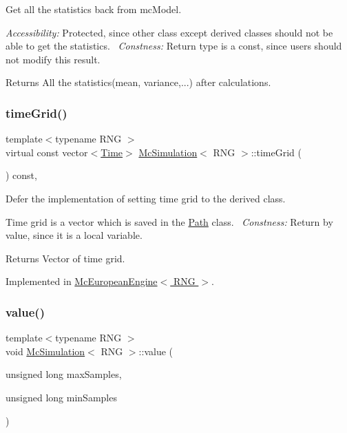 Get all the statistics back from mc\+Model. 

{\itshape Accessibility\+:} Protected, since other class except derived classes should not be able to get the statistics.~\newline
{\itshape Constness\+:} Return type is a const, since users should not modify this result. \begin{DoxyReturn}{Returns}
All the statistics(mean, variance,...) after calculations. 
\end{DoxyReturn}
\hypertarget{class_mc_simulation_a8af54a9121f2d875872295b03a1b2a40}{}\label{class_mc_simulation_a8af54a9121f2d875872295b03a1b2a40} 
\subsubsection{\texorpdfstring{time\+Grid()}{timeGrid()}}
{\footnotesize\ttfamily template$<$typename R\+NG $>$ \\
virtual const vector$<$\hyperlink{_name_def_8h_ac2d3e0ba793497bcca555c7c2cf64ff3}{Time}$>$ \hyperlink{class_mc_simulation}{Mc\+Simulation}$<$ R\+NG $>$\+::time\+Grid (\begin{DoxyParamCaption}{ }\end{DoxyParamCaption}) const\hspace{0.3cm}{\ttfamily [private]}, {}}



Defer the implementation of setting time grid to the derived class. 

Time grid is a vector which is saved in the \hyperlink{class_path}{Path} class.~\newline
{\itshape Constness\+:} Return by value, since it is a local variable. \begin{DoxyReturn}{Returns}
Vector of time grid. 
\end{DoxyReturn}


Implemented in \hyperlink{class_mc_european_engine_a62341229306247e5c1eed9a7d4a2dba3}{Mc\+European\+Engine$<$ R\+N\+G $>$}.

\hypertarget{class_mc_simulation_a476b6d633c6ebb742d6d26a62a6a3810}{}\label{class_mc_simulation_a476b6d633c6ebb742d6d26a62a6a3810} 
\subsubsection{\texorpdfstring{value()}{value()}}
{\footnotesize\ttfamily template$<$typename R\+NG $>$ \\
void \hyperlink{class_mc_simulation}{Mc\+Simulation}$<$ R\+NG $>$\+::value (\begin{DoxyParamCaption}\item[{unsigned long}]{max\+Samples,  }\item[{unsigned long}]{min\+Samples }\end{DoxyParamCaption})\hspace{0.3cm}{\ttfamily [private]}}




